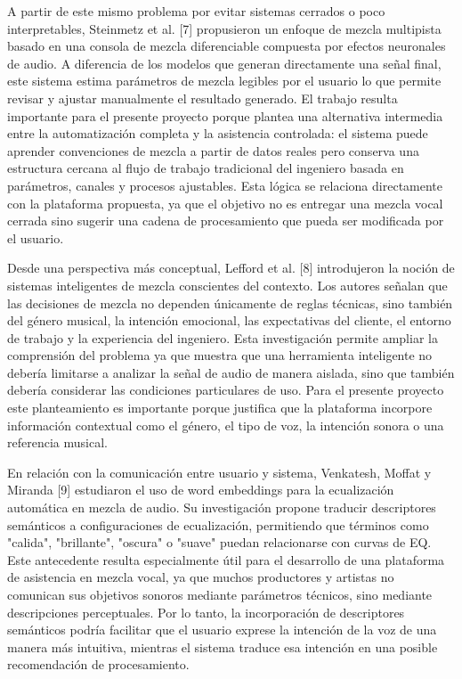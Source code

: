A partir de este mismo problema por evitar sistemas cerrados o poco interpretables, Steinmetz et al. [7] propusieron un enfoque de mezcla multipista basado en una consola de mezcla diferenciable compuesta por efectos neuronales de audio. A diferencia de los modelos que generan directamente una señal final, este sistema estima parámetros de mezcla legibles por el usuario lo que permite revisar y ajustar manualmente el resultado generado. El trabajo resulta importante para el presente proyecto porque plantea una alternativa intermedia entre la automatización completa y la asistencia controlada: el sistema puede aprender convenciones de mezcla a partir de datos reales pero conserva una estructura cercana al flujo de trabajo tradicional del ingeniero basada en parámetros, canales y procesos ajustables. Esta lógica se relaciona directamente con la plataforma propuesta, ya que el objetivo no es entregar una mezcla vocal cerrada sino sugerir una cadena de procesamiento que pueda ser modificada por el usuario.

Desde una perspectiva más conceptual, Lefford et al. [8] introdujeron la noción de sistemas inteligentes de mezcla conscientes del contexto. Los autores señalan que las decisiones de mezcla no dependen únicamente de reglas técnicas, sino también del género musical, la intención emocional, las expectativas del cliente, el entorno de trabajo y la experiencia del ingeniero. Esta investigación permite ampliar la comprensión del problema ya que muestra que una herramienta inteligente no debería limitarse a analizar la señal de audio de manera aislada, sino que también debería considerar las condiciones particulares de uso. Para el presente proyecto este planteamiento es importante porque justifica que la plataforma incorpore información contextual como el género, el tipo de voz, la intención sonora o una referencia musical.

En relación con la comunicación entre usuario y sistema, Venkatesh, Moffat y Miranda [9] estudiaron el uso de word embeddings para la ecualización automática en mezcla de audio. Su investigación propone traducir descriptores semánticos a configuraciones de ecualización, permitiendo que términos como "calida", "brillante", "oscura" o "suave" puedan relacionarse con curvas de EQ. Este antecedente resulta especialmente útil para el desarrollo de una plataforma de asistencia en mezcla vocal, ya que muchos productores y artistas no comunican sus objetivos sonoros mediante parámetros técnicos, sino mediante descripciones perceptuales. Por lo tanto, la incorporación de descriptores semánticos podría facilitar que el usuario exprese la intención de la voz de una manera más intuitiva, mientras el sistema traduce esa intención en una posible recomendación de procesamiento.

